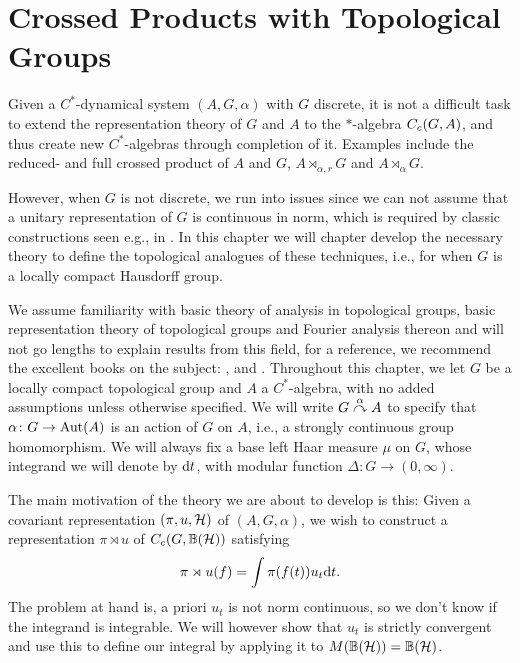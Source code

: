 \chapter{Crossed Products with Topological Groups}
Given a $C^*$-dynamical system $(A,G,\alpha)$ with $G$ discrete, it is not a difficult task to extend the representation theory of $G$ and $A$ to the $*$-algebra $C_c(G,A)$, and thus create new $C^*$-algebras through completion of it. Examples include the reduced- and full crossed product of $A$ and $G$, $A \rtimes_{\alpha,r} G$ and $A \rtimes_{\alpha} G$.

However, when $G$ is not discrete, we run into issues since we can not assume that a unitary representation of $G$ is continuous in norm, which is required by classic constructions seen e.g., in \cite{brown2008c}. In this chapter we will chapter develop the necessary theory to define the topological analogues of these techniques, i.e., for when $G$ is a locally compact Hausdorff group.

We assume familiarity with basic theory of analysis in topological groups, basic representation theory of topological groups and Fourier analysis thereon and will not go lengths to explain results from this field, for a reference, we recommend the excellent books on the subject: \cite{folland2016fourier}, \cite{berg1984harmonic} and \cite{folland2013real}. 
Throughout this chapter, we let $G$ be a locally compact topological group and $A$ a $C^*$-algebra, with no added assumptions unless otherwise specified. We will write $G \stackrel{\alpha}{\curvearrowright} A$ to specify that $\alpha \colon G \to \operatorname{Aut}(A)$ is an action of $G$ on $A$, i.e., a strongly continuous group homomorphism. We will always fix a base left Haar measure $\mu$ on $G$, whose integrand we will denote by $\mathrm{d} t$, with modular function $\Delta \colon G \to (0,\infty)$. 

The main motivation of the theory we are about to develop is this: Given a  covariant representation $(\pi,u,\mathcal{H})$ of $(A,G,\alpha)$, we wish to construct a representation $\pi \rtimes u$ of $C_c(G,\mathbb{B}(\mathcal{H}))$ satisfying 
\begin{align*}
\pi \rtimes u (f) = \int \pi(f(t))u_t \mathrm{d} t.
\end{align*}
The problem at hand is, a priori $u_t$ is not norm continuous, so we don't know if the integrand is integrable. We will however show that $u_t$ is strictly convergent and use this to define our integral by applying it to $M(\mathbb{B}(\mathcal{H})) = \mathbb{B}(\mathcal{H})$. 

